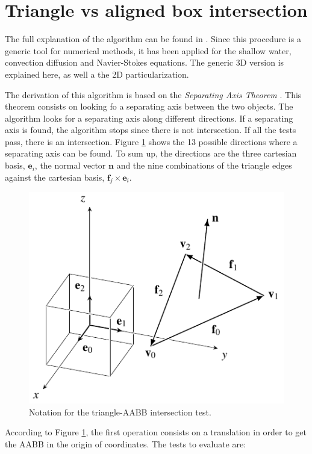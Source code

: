 \section{Triangle vs aligned box intersection}

The full explanation of the algorithm can be found in \cite{mollerakenine2004}. Since this procedure is a generic tool for numerical methods, it has been applied for the shallow water, convection diffusion and Navier-Stokes equations. The generic 3D version is explained here, as well a the 2D particularization.

The derivation of this algorithm is based on the \emph{Separating Axis Theorem} \cite{gottschalk1996}. This theorem consists on looking fo a separating axis between the two objects. 
The algorithm looks for a separating axis along different directions. If a separating axis is found, the algorithm stops since there is not intersection. If all the tests pass, there is an intersection.
Figure \ref{triangle_aabb} shows the 13 possible directions where a separating axis can be found. To sum up, the directions are the three cartesian basis, $\mathbf{e}_i$, the normal vector $\mathbf{n}$ and the nine combinations of the triangle edges against the cartesian basis, $\mathbf{f}_j \times \mathbf{e}_i$.

\begin{figure}
    \centering
    \includegraphics[width=.6\textwidth]{img/search/triangle_aabb.pdf}
    \caption{Notation for the triangle-AABB intersection test.}
    \label{triangle_aabb}
\end{figure}

According to Figure \ref{triangle_aabb}, the first operation consists on a translation in order to get the AABB in the origin of coordinates. The tests to evaluate are:


